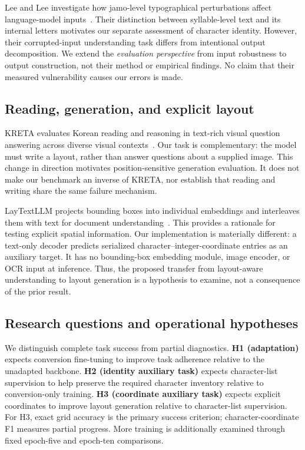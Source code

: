 \documentclass[journal]{IEEEtran}
\begin{document}
Lee and Lee investigate how jamo-level typographical perturbations affect language-model inputs~\cite{lee2026jamo}. Their distinction between syllable-level text and its internal letters motivates our separate assessment of character identity. However, their corrupted-input understanding task differs from intentional output decomposition. We extend the \emph{evaluation perspective} from input robustness to output construction, not their method or empirical findings. No claim that their measured vulnerability causes our errors is made.

\subsection{Reading, generation, and explicit layout}
KRETA evaluates Korean reading and reasoning in text-rich visual question answering across diverse visual contexts~\cite{hwang2025kreta}. Our task is complementary: the model must write a layout, rather than answer questions about a supplied image. This change in direction motivates position-sensitive generation evaluation. It does not make our benchmark an inverse of KRETA, nor establish that reading and writing share the same failure mechanism.

LayTextLLM projects bounding boxes into individual embeddings and interleaves them with text for document understanding~\cite{lu2025bounding}. This provides a rationale for testing explicit spatial information. Our implementation is materially different: a text-only decoder predicts serialized character--integer-coordinate entries as an auxiliary target. It has no bounding-box embedding module, image encoder, or OCR input at inference. Thus, the proposed transfer from layout-aware understanding to layout generation is a hypothesis to examine, not a consequence of the prior result.

\subsection{Research questions and operational hypotheses}
We distinguish complete task success from partial diagnostics. \textbf{H1 (adaptation)} expects conversion fine-tuning to improve task adherence relative to the unadapted backbone. \textbf{H2 (identity auxiliary task)} expects character-list supervision to help preserve the required character inventory relative to conversion-only training. \textbf{H3 (coordinate auxiliary task)} expects explicit coordinates to improve layout generation relative to character-list supervision. For H3, exact grid accuracy is the primary success criterion; character-coordinate F1 measures partial progress. More training is additionally examined through fixed epoch-five and epoch-ten comparisons.
\end{document}
